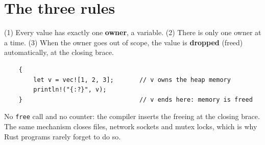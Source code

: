 \section*{The three rules}
\begin{keyidea}
(1) Every value has exactly one \textbf{owner}, a variable. (2) There is only one owner at a time. (3) When the owner goes out of scope, the value is \textbf{dropped} (freed) automatically, at the closing brace.
\end{keyidea}
\begin{verbatim}
    {
        let v = vec![1, 2, 3];       // v owns the heap memory
        println!("{:?}", v);
    }                                // v ends here: memory is freed
\end{verbatim}
No \verb!free! call and no counter: the compiler inserts the freeing at the closing brace. The same mechanism closes files, network sockets and mutex locks, which is why Rust programs rarely forget to do so.

